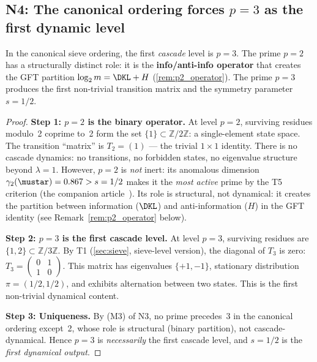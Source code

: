 \documentclass[12pt,a4paper]{article}
\begin{document}
\subsection{N4: The canonical ordering forces $p = 3$ as the first dynamic level}
\label{sec:N4}

\mTHM
\begin{theorem}
\label{thm:N4}
In the canonical sieve ordering, the first \emph{cascade} level
is $p = 3$. The prime $p = 2$ has a structurally distinct role:
it is the \textbf{info/anti-info operator} that creates the GFT
partition $\log_2 m = \DKL + H$ (\cref{rem:p2_operator}).
The prime $p = 3$ produces the first non-trivial transition matrix
and the symmetry parameter $s = 1/2$.

\begin{proof}
\textbf{Step 1: $p = 2$ is the binary operator.}
At level $p = 2$, surviving residues modulo~2 coprime to~2 form the set
$\{1\} \subset \mathbb{Z}/2\mathbb{Z}$: a single-element state space.
The transition ``matrix'' is $T_2 = (1)$ --- the trivial $1 \times 1$
identity. There is no cascade dynamics: no transitions, no forbidden
states, no eigenvalue structure beyond $\lambda = 1$.
However, $p = 2$ is \emph{not} inert:
its anomalous dimension $\gamma_2(\mustar) = 0.867 > s = 1/2$ makes it
the \emph{most active} prime by the T5 criterion
(the companion article~\cite{companion_M3}). Its role is structural, not dynamical:
it creates the partition between information ($\DKL$) and
anti-information ($H$) in the GFT identity
(see Remark~\ref{rem:p2_operator} below).

\textbf{Step 2: $p = 3$ is the first cascade level.}
At level $p = 3$, surviving residues are $\{1, 2\} \subset \mathbb{Z}/3\mathbb{Z}$.
By T1 (\cref{sec:sieve}, sieve-level version), the diagonal of $T_3$ is zero:
$T_3 = \begin{pmatrix} 0 & 1 \\ 1 & 0 \end{pmatrix}$.
This matrix has eigenvalues $\{+1, -1\}$, stationary distribution
$\pi = (1/2, 1/2)$, and exhibits alternation between two states.
This is the first non-trivial dynamical content.

\textbf{Step 3: Uniqueness.}
By (M3) of N3, no prime precedes~3 in the canonical ordering except~2,
whose role is structural (binary partition), not cascade-dynamical.
Hence $p = 3$ is \emph{necessarily} the first cascade level,
and $s = 1/2$ is the \emph{first dynamical output}.
\end{proof}
\end{theorem}
\end{document}
